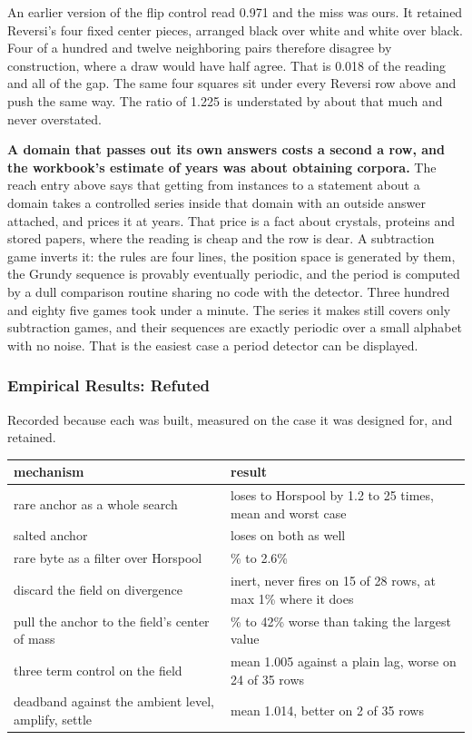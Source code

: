 An earlier version of the flip control read 0.971 and the miss was ours. It retained Reversi's four fixed center pieces, arranged black over white and white over black. Four of a hundred and twelve neighboring pairs therefore disagree by construction, where a draw would have half agree. That is 0.018 of the reading and all of the gap. The same four squares sit under every Reversi row above and push the same way. The ratio of 1.225 is understated by about that much and never overstated.

\textbf{A domain that passes out its own answers costs a second a row, and the workbook's estimate of years was about obtaining corpora.} The reach entry above says that getting from instances to a statement about a domain takes a controlled series inside that domain with an outside answer attached, and prices it at years. That price is a fact about crystals, proteins and stored papers, where the reading is cheap and the row is dear. A subtraction game inverts it: the rules are four lines, the position space is generated by them, the Grundy sequence is provably eventually periodic, and the period is computed by a dull comparison routine sharing no code with the detector. Three hundred and eighty five games took under a minute. The series it makes still covers only subtraction games, and their sequences are exactly periodic over a small alphabet with no noise. That is the easiest case a period detector can be displayed.

\subsubsection{Empirical Results: Refuted}

Recorded because each was built, measured on the case it was designed for, and retained.

\tiny
\setlength{\tabcolsep}{2pt}
\begin{longtable}{@{}>{\raggedright\arraybackslash}p{}>{\raggedright\arraybackslash}p{}@{}}
\toprule
mechanism & result \\
\midrule
rare anchor as a whole search & loses to Horspool by 1.2 to 25 times, mean and worst case \\
salted anchor & loses on both as well \\
rare byte as a filter over Horspool & 0.0\% to 2.6\% \\
discard the field on divergence & inert, never fires on 15 of 28 rows, at max 1\% where it does \\
pull the anchor to the field's center of mass & 2\% to 42\% worse than taking the largest value \\
three term control on the field & mean 1.005 against a plain lag, worse on 24 of 35 rows \\
deadband against the ambient level, amplify, settle & mean 1.014, better on 2 of 35 rows \\
\bottomrule
\end{longtable}
\normalsize

